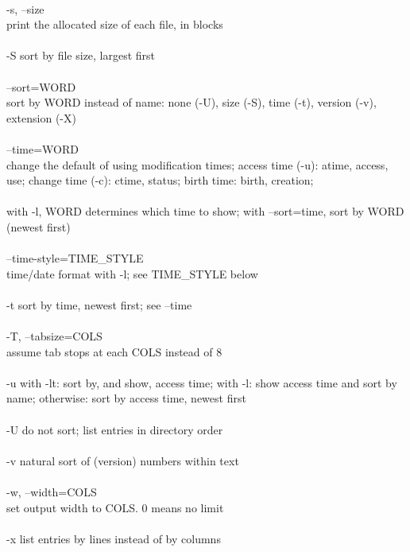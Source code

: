 \documentclass{article}
\begin{document}
\\
       -s, --size \\
              print the allocated size of each file, in blocks \\
\\
       -S     sort by file size, largest first \\
\\
       --sort=WORD \\
              sort  by  WORD instead of name: none (-U), size (-S), time (-t),
              version (-v), extension (-X) \\
\\
       --time=WORD \\
              change the default of  using  modification  times;  access  time
              (-u): atime, access, use; change time (-c): ctime, status; birth
              time: birth, creation; \\
\\
              with -l, WORD determines which time to show;  with  --sort=time,
              sort by WORD (newest first) \\
\\
       --time-style=TIME_STYLE \\
              time/date format with -l; see TIME_STYLE below \\
\\
       -t     sort by time, newest first; see --time \\
\\
       -T, --tabsize=COLS \\
              assume tab stops at each COLS instead of 8 \\
\\
       -u     with  -lt:  sort by, and show, access time; with -l: show access
              time and sort by name; otherwise: sort by  access  time,  newest
              first \\
\\
       -U     do not sort; list entries in directory order \\
\\
       -v     natural sort of (version) numbers within text \\
\\
       -w, --width=COLS \\
              set output width to COLS.  0 means no limit \\
\\
       -x     list entries by lines instead of by columns \\
\end{document}
